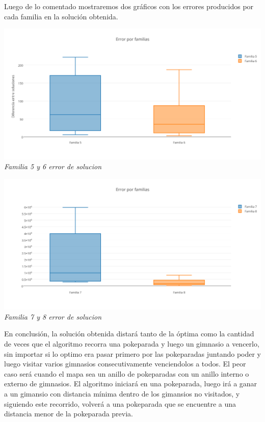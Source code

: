 Luego de lo comentado mostraremos dos gr\'aficos con los errores producidos por cada familia en la soluci\'on obtenida.

\vspace*{0.3cm} \vspace*{0.3cm}
  \begin{center}
\includegraphics[scale=0.60]{./EJ2/box1.png}
\\{\textit{Familia 5 y 6 error de solucion}}
  \end{center}
  \vspace*{0.3cm}
  
\vspace*{0.3cm} \vspace*{0.3cm}
  \begin{center}
\includegraphics[scale=0.60]{./EJ2/box2.png}
\\{\textit{Familia 7 y 8 error de solucion}}
  \end{center}
  \vspace*{0.3cm}
  
En conclusi\'on, la soluci\'on obtenida distará tanto de la óptima como la cantidad de veces que el algoritmo recorra una pokeparada y luego un gimnasio a vencerlo, sin importar si lo optimo era pasar primero por las pokeparadas juntando poder y luego visitar varios gimnasios consecutivamente venciendolos a todos.
El peor caso será cuando el mapa sea un anillo de pokeparadas con un anillo interno o externo de gimnasios. 
El algoritmo iniciará en una pokeparada, luego irá a ganar a un gimansio con distancia mínima dentro de los gimansios no visitados, y siguiendo este recorrido, volverá a una pokeparada que se encuentre a una distancia menor de la pokeparada previa.\\

